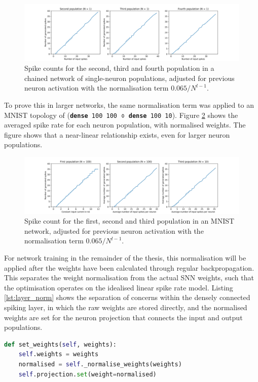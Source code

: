 \begin{figure}
  \includegraphics[width=\linewidth]{images/spike_rate_chain.png}
  \caption{Spike counts for the second, third and fourth population in a chained network of
  single-neuron populations, adjusted for previous neuron activation with the
  normalisation term $0.065 / N^{l - 1}$.}
  \label{fig:spike_rates_chain}
\end{figure}

To prove this in larger networks, the same normalisation term was applied to an MNIST
topology of (\texttt{\textbf{dense} 100 100 $\obar$ \textbf{dense} 100 10}).
Figure \ref{fig:spike_rates_mnist} shows the averaged spike rate for each neuron
population, with normalised weights.
The figure shows that a near-linear relationship exists, even for larger neuron populations.

\begin{figure}
  \includegraphics[width=\linewidth]{images/spike_rate_mnist.png}
  \caption{Spike count for the first, second and third population in an MNIST
    network, adjusted for previous neuron activation with the
  normalisation term $0.065 / N^{l - 1}$.}
  \label{fig:spike_rates_mnist}
\end{figure}

For network training in the remainder of the thesis, this normalisation will
be applied after the weights have been calculated through regular backpropagation. 
This separates the weight normalisation from the actual \gls{SNN} weights, such
that the optimisation operates on the idealised linear spike rate model.
Listing \ref{lst:layer_norm} shows the separation of concerns within the densely
connected spiking layer, in which the raw weights are stored directly, and the normalised
weights are set for the neuron projection that connects the input and output
populations.

\begin{lstlisting}[language=Python,label={lst:layer_norm},caption={Weight
normalisation in the spiking dense layer.}]
def set_weights(self, weights): 
    self.weights = weights
    normalised = self._normalise_weights(weights)
    self.projection.set(weight=normalised)   
\end{lstlisting}


